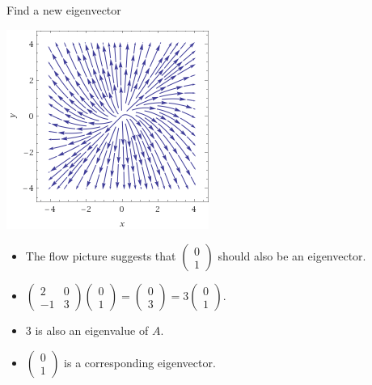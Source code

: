\documentclass{beamer}
\begin{document}
\begin{frame}{Find a new eigenvector}


\begin{center}
\includegraphics[scale=0.45]{stream1}
\end{center}

\begin{itemize}
\item The flow picture suggests that
$
\begin{pmatrix}
0 \\
1
\end{pmatrix}
$
should also be an eigenvector.
\item
$
\begin{pmatrix}
2 & 0 \\
-1 & 3
\end{pmatrix}
\begin{pmatrix}
0 \\
1
\end{pmatrix}
=
\begin{pmatrix}
0 \\
3
\end{pmatrix}
= 3
\begin{pmatrix}
0 \\
1
\end{pmatrix}
.
$
\item 3 is also an eigenvalue of $A$.
\item
$
\begin{pmatrix}
0 \\
1
\end{pmatrix}
$
is a corresponding eigenvector.
\end{itemize}
\end{frame}

\end{document}
